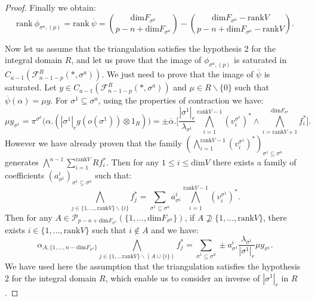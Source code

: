 \documentclass[10pt,a4paper]{amsart}
\begin{document}
\begin{proof}
    Finally we obtain:
    \begin{equation*}
        \mathrm{rank}~ \phi_{\sigma^{a},(p)} = \mathrm{rank} ~\overline{\psi} = \binom{\mathrm{dim}F_{\sigma^a}}{p-n+\mathrm{dim}F_{\sigma^a}}-\binom{\mathrm{dim}F_{\sigma^a}-\mathrm{rank}V}{p-n+\mathrm{dim}F_{\sigma^a}-\mathrm{rank}V}.
    \end{equation*}

    Now let us assume that the triangulation satisfies the hypothesis 2 for the integral domain $R$, and let us prove that the image of $\phi_{\sigma^{a},(p)}$ is saturated in $C_{a-1}(\mathcal{F}_{n-1-p}^R(*,\sigma^a))$. We just need to prove that the image of $\overline{\psi}$ is saturated. Let $y \in C_{a-1}(\mathcal{F}_{n-1-p}^R(*,\sigma^a))$ and $\mu \in R\backslash\{0\}$ such that $\overline{\psi}(\alpha) = \mu y$. For $\sigma^1 \subseteq \sigma^a$, using the properties of contraction we have:
    \begin{equation*}
        \mu y_{\sigma^1} =\pi^{\sigma^a} \Bigg( \alpha.(|\sigma^1|_rg(o(\sigma^1))\otimes1_R) \Bigg)= \pm\overline{\alpha}.\Bigg[\frac{|\sigma^1|_r}{\lambda_{\sigma^1}}\bigwedge_{i=1}^{\mathrm{rank}V -1}(v_i^{\sigma^1})^*\wedge\bigwedge_{i=\mathrm{rank}V+1}^{\mathrm{dim}F_{\sigma^a}} f_i^*\Bigg].
    \end{equation*}
    However we have already proven that the family  $( \bigwedge_{i=1}^{\mathrm{rank}V-1}(v_i^{\sigma^1})^*)_{\sigma^1 \subseteq \sigma^a}$ generates $\bigwedge^{n-1}\sum_{i=1}^{\mathrm{rank}V}Rf_i^*$. Then for any $1 \leq i\leq \mathrm{dim}V$ there exists a family of coefficients $(a^i_{\sigma^1})_{\sigma^1\subseteq \sigma^a}$ such that:
    \begin{equation*}
        \bigwedge_{j\in\{1,...,\mathrm{rank}V\}\backslash\{i\}}f_j^*=\sum_{\sigma^1\subseteq \sigma^a}a^i_{\sigma^1}\bigwedge_{i=1}^{\mathrm{rank}V-1}(v_i^{\sigma^1})^*.
    \end{equation*}
    Then for any $A \in \mathcal{P}_{p-n+\mathrm{dim} F_{\sigma^a}}(\{1,...,\mathrm{dim}F_{\sigma^a}\})$, if $A \not\supseteq\{1,...,\mathrm{rank}V\}$, there exists $i\in\{1,...,\mathrm{rank}V\}$ such that $i\not\in A$ and we have:
    \begin{equation*}
        \alpha_{A,\{1,...,n-\mathrm{dim}F_{\sigma^a}\}} \bigwedge_{j\in\{1,...\mathrm{rank}V\}\backslash(A\cup\{i\})}f_j^* = \sum_{\sigma^1\subseteq \sigma^a}\pm a^i_{\sigma^1}\frac{\lambda_{\sigma^1}}{|\sigma^1|_r} \mu y_{\sigma^1}.
    \end{equation*}
    We have used here the assumption that the triangulation satisfies the hypothesis $2$ for the integral domain $R$, which enable us to consider an inverse of $|\sigma^1|_r$ in $R$.
    

\end{proof}
\end{document}
